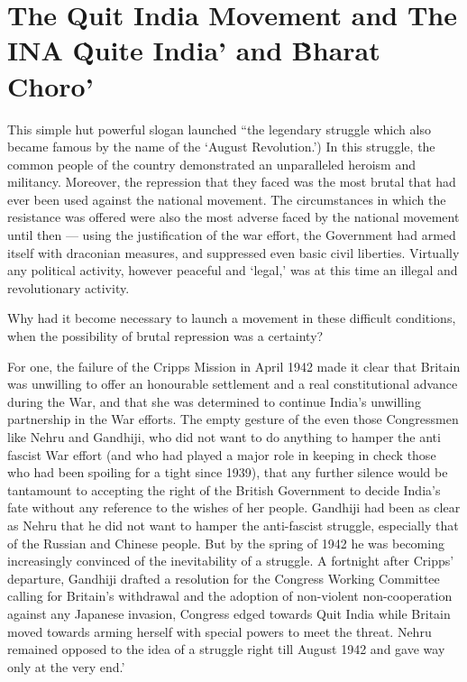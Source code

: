 \chapter[The Quit India Movement, INA \& Bharat Choro]{The Quit India Movement and The INA \`Quite India' and \`Bharat Choro'}

This simple hut powerful slogan launched “the legendary struggle which also became famous by the name of the ‘August Revolution.’) In this struggle, the common people of the country demonstrated an unparalleled heroism and militancy. Moreover, the repression that they faced was the most brutal that had ever been used against the national movement. The circumstances in which the resistance was offered were also the most adverse faced by the national movement until then — using the justification of the war effort, the Government had armed itself with draconian measures, and suppressed even basic civil liberties. Virtually any political activity, however peaceful and ‘legal,’ was at this time an illegal and revolutionary activity.

Why had it become necessary to launch a movement in these difficult conditions, when the possibility of brutal repression was a certainty?

For one, the failure of the Cripps Mission in April 1942 made it clear that Britain was unwilling to offer an honourable settlement and a real constitutional advance during the War, and that she was determined to continue India’s unwilling partnership in the War efforts. The empty gesture of the even those Congressmen like Nehru and Gandhiji, who did not want to do anything to hamper the anti fascist War effort (and who had played a major role in keeping in check those who had been spoiling for a tight since 1939), that any further silence would be tantamount to accepting the right of the British Government to decide India’s fate without any reference to the wishes of her people. Gandhiji had been as clear as Nehru that he did not want to hamper the anti-fascist struggle, especially that of the Russian and Chinese people. But by the spring of 1942 he was becoming increasingly convinced of the inevitability of a struggle. A fortnight after Cripps’ departure, Gandhiji drafted a resolution for the Congress Working Committee calling for Britain’s withdrawal and the adoption of non-violent non-cooperation against any Japanese invasion, Congress edged towards Quit India while Britain moved towards arming herself with special powers to meet the threat. Nehru remained opposed to the idea of a struggle right till August 1942 and gave way only at the very end.’

